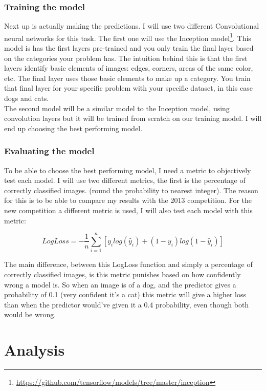 \documentclass[11pt]{article}
\begin{document}
\subsubsection{Training the model}
Next up is actually making the predictions. I will use two different Convolutional neural networks for this task. The first one will use the Inception model\footnote{\url{https://github.com/tensorflow/models/tree/master/inception}}. This model is has the first layers pre-trained and you only train the final layer based on the categories your problem has. The intuition behind this is that the first layers identify basic elements of images: edges, corners, areas of the same color, etc. The final layer uses those basic elements to make up a category. You train that final layer for your specific problem with your specific dataset, in this case dogs and cats.\\

The second model will be a similar model to the Inception model, using convolution layers but it will be trained from scratch on our training model. I will end up choosing the best performing model.
\pagebreak[4]
\subsubsection{Evaluating the model}
To be able to choose the best performing model, I need a metric to objectively test each model. I will use two different metrics, the first is the percentage of correctly classified images. (round the probability to nearest integer). The reason for this is to be able to compare my results with the 2013 competition. For the new competition a different metric is used, I will also test each model with this metric: 

\[
LogLoss = -\dfrac{1}{n}\sum\limits^{n}_{i=1}[y_i log(\hat{y}_i) + (1-y_i)log(1-\hat{y}_i)]
\]

The main difference, between this LogLoss function and simply a percentage of correctly classified images, is this metric punishes based on how confidently wrong a model is. So when an image is of a dog, and the predictor gives a probability of 0.1 (very confident it's a cat) this metric will give a higher loss than when the predictor would've given it a 0.4 probability, even though both would be wrong.

\pagebreak[4]
\section{Analysis}
\end{document}
